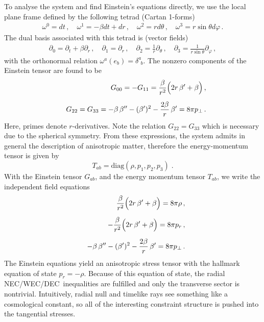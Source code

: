 \documentclass[11pt]{article}
\makeatletter
\newcommand{\@abbr}[1]{\ifmmode\mathrm{#1}\else\textsc{#1}\fi}
\newcommand{\WEC}{\@abbr{WEC}}
\newcommand{\NEC}{\@abbr{NEC}}
\newcommand{\DEC}{\@abbr{DEC}}
\makeatother
\begin{document}
To analyse the system and find Einstein's equations directly, we use the local plane frame defined by the following tetrad (Cartan 1-forms)
\begin{eqnarray}\label{eq:tetrad}
    \omega^{0} = dt\,, \quad
    \omega^1 = -\beta dt+dr\,, \quad
    \omega^2 = rd\theta\,, \quad
    \omega^3 = r\sin{\theta}d\varphi\,.
\end{eqnarray}
The dual basis associated with this tetrad is (vector fields)
\begin{eqnarray}
    \partial_{0} = \partial_t + \beta\partial_r\,, \quad
    \partial_1 = \partial_r\,, \quad
    \partial_2 = \frac{1}{r}\partial_\theta\,, \quad
    \partial_3 = \frac{1}{r\sin{\theta}}\partial_\varphi\,, \label{tetrad4}
\end{eqnarray}
with the orthonormal relation $\omega^a(e_b)=\delta^{a}_{\;\,b}$.
The nonzero components of the Einstein tensor are found to be
\begin{eqnarray}
		& & G_{00} = -G_{11} = \frac{\beta}{r^2}\Bigl(2r\,\beta' + \beta\Bigr) \, , \\[2mm]
		& & G_{22} = G_{33} = -\beta\,\beta'' - (\beta')^2 - \frac{2\beta}{r}\,\beta' = 8\pi p_\perp\,.
\end{eqnarray}
Here, primes denote $r$-derivatives. Note the relation $G_{22}=G_{33}$ which is necessary due to the spherical symmetry. From these expressions, the system admits in general the description of anisotropic matter, therefore the energy-momentum tensor is given by
\begin{equation}
T_{ab} = \mathrm{diag}(\rho, p_1, p_2, p_3)\;.
\end{equation}
With the Einstein tensor $G_{ab}$, and the energy momentum tensor $T_{ab}$, we write the independent field equations
\begin{eqnarray}
\label{Gtt-eqn}
& &  \frac{\beta}{r^2}\Bigl(2r\,\beta' + \beta\Bigr) = 8\pi \rho\,, \\[2mm]
\label{Grr-eqn}
& &  -\frac{\beta}{r^2}\Bigl(2r\,\beta' + \beta\Bigr) = 8\pi p_r\,, \\[2mm]
\label{G22-eqn}
 & &  -\beta\,\beta'' - (\beta')^2 - \frac{2\beta}{r}\,\beta' = 8\pi p_\perp\,.
\end{eqnarray}
The Einstein equations yield an anisotropic stress tensor with the hallmark equation of state $p_r=-\rho$.
Because of this equation of state, the radial \NEC/\WEC/\DEC\ inequalities are fulfilled and only the transverse sector is nontrivial. Intuitively, radial null and timelike rays see something like a cosmological constant, so all of the interesting constraint structure is pushed into the tangential stresses.
\end{document}
